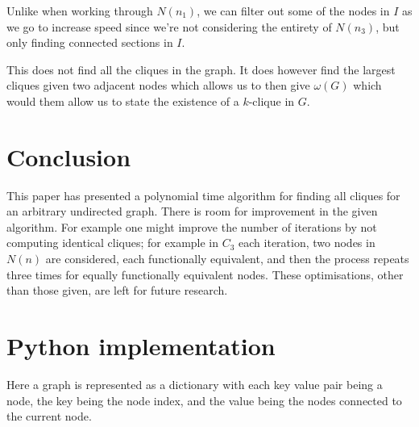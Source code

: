 \documentclass[11pt]{article}
\begin{document}
Unlike when working through $N(n_1)$, we can filter out some of the nodes in $I$ as we go to increase speed since we're not considering the entirety of $N(n_3)$, but only finding connected sections in $I$.

This does not find all the cliques in the graph. It does however find the largest cliques given two adjacent nodes which allows us to then give $\omega(G)$ which would them allow us to state the existence of a $k$-clique in $G$.

\section{Conclusion}

This paper has presented a polynomial time algorithm for finding all cliques for an arbitrary undirected graph. There is room for improvement in the given algorithm. For example one might improve the number of iterations by not computing identical cliques; for example in $C_3$ each iteration, two nodes in $N(n)$ are considered, each functionally equivalent, and then the process repeats three times for equally functionally equivalent nodes. These optimisations, other than those given, are left for future research.

\appendix
\section{Python implementation}
Here a graph is represented as a dictionary with each key value pair being a node, the key being the node index, and the value being the nodes connected to the current node.

\end{document}
